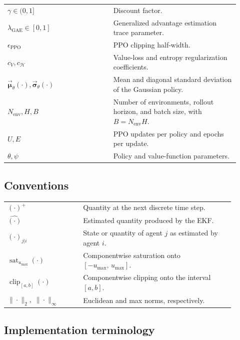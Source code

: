 \begin{longtable}{>{\raggedright\arraybackslash}p{0.42\linewidth}
                  >{\raggedright\arraybackslash}p{0.50\linewidth}}
\(\gamma \in (0,1]\) & Discount factor.\\
\(\lambda_{\mathrm{GAE}}\in[0,1]\) & Generalized advantage estimation trace parameter.\\
\(\epsilon_{\mathrm{PPO}}\) & PPO clipping half-width.\\
\(c_V, c_{\mathcal{H}}\) & Value-loss and entropy regularization coefficients.\\
\(\vec{\boldsymbol{\mu}}_\theta(\cdot),\vec{\boldsymbol{\sigma}}_\theta(\cdot)\) & Mean and diagonal standard deviation of the Gaussian policy.\\
\(N_{\mathrm{env}},H,B\) & Number of environments, rollout horizon, and batch size, with \(B=N_{\mathrm{env}}H\).\\
\(U,E\) & PPO updates per policy and epochs per update.\\
\(\theta,\psi\) & Policy and value-function parameters.\\
\end{longtable}

\subsection{Conventions}

\begin{center}
\renewcommand{\arraystretch}{1.15}
\begin{tabular}{p{0.30\linewidth}p{0.60\linewidth}}
\((\cdot)^{+}\) & Quantity at the next discrete time step.\\
\(\hat{(\cdot)}\) & Estimated quantity produced by the EKF.\\
\((\cdot)_{j|i}\) & State or quantity of agent \(j\) as estimated by agent \(i\).\\
\(\operatorname{sat}_{u_{\max}}(\cdot)\) & Componentwise saturation onto \([ -u_{\max},\,u_{\max}]\).\\
\(\operatorname{clip}_{[a,b]}(\cdot)\) & Componentwise clipping onto the interval \([a,b]\).\\
\(\|\cdot\|_2,\;\|\cdot\|_\infty\) & Euclidean and max norms, respectively.\\
\end{tabular}
\end{center}

\subsection{Implementation terminology}

